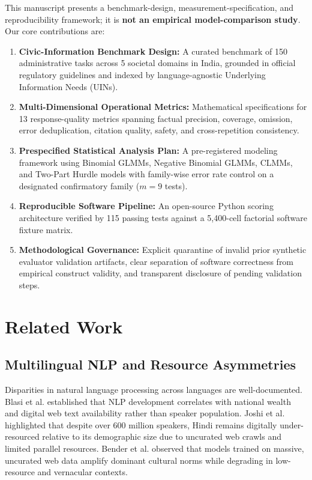 \documentclass[11pt,a4paper]{article}
\begin{document}
This manuscript presents a benchmark-design, measurement-specification, and reproducibility framework; it is \textbf{not an empirical model-comparison study}. Our core contributions are:
\begin{enumerate}
  \item \textbf{Civic-Information Benchmark Design:} A curated benchmark of 150 administrative tasks across 5 societal domains in India, grounded in official regulatory guidelines and indexed by language-agnostic Underlying Information Needs (UINs).
  \item \textbf{Multi-Dimensional Operational Metrics:} Mathematical specifications for 13 response-quality metrics spanning factual precision, coverage, omission, error deduplication, citation quality, safety, and cross-repetition consistency.
  \item \textbf{Prespecified Statistical Analysis Plan:} A pre-registered modeling framework using Binomial GLMMs, Negative Binomial GLMMs, CLMMs, and Two-Part Hurdle models with family-wise error rate control on a designated confirmatory family ($m=9$ tests).
  \item \textbf{Reproducible Software Pipeline:} An open-source Python scoring architecture verified by 115 passing tests against a 5,400-cell factorial software fixture matrix.
  \item \textbf{Methodological Governance:} Explicit quarantine of invalid prior synthetic evaluator validation artifacts, clear separation of software correctness from empirical construct validity, and transparent disclosure of pending validation steps.
\end{enumerate}

\section{Related Work}
\label{sec:related}

\subsection{Multilingual NLP and Resource Asymmetries}
\label{sec:related_asymmetries}

Disparities in natural language processing across languages are well-documented. Blasi et al. \cite{blasi2022systematic} established that NLP development correlates with national wealth and digital web text availability rather than speaker population. Joshi et al. \cite{joshi2020state} highlighted that despite over 600 million speakers, Hindi remains digitally under-resourced relative to its demographic size due to uncurated web crawls and limited parallel resources. Bender et al. \cite{bender2021dangers} observed that models trained on massive, uncurated web data amplify dominant cultural norms while degrading in low-resource and vernacular contexts.
\end{document}
